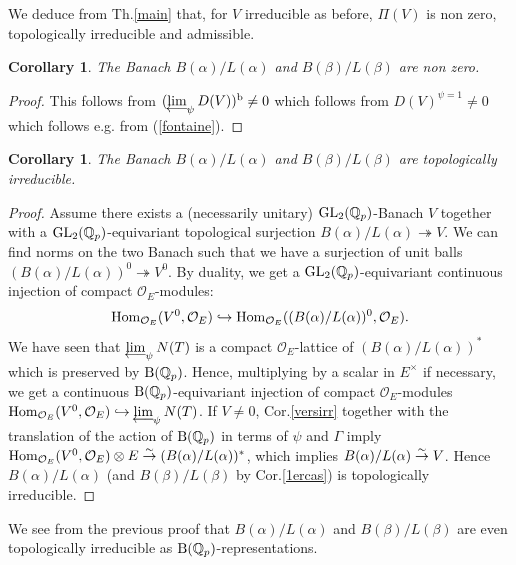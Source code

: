 \documentclass[11pt]{amsart}
\def\limproj{\mathop{\oalign{{\rm lim}\cr 
\hidewidth$\longleftarrow$\hidewidth\cr}}}
\def\Q{{\mathbb Q}_p}
\def\G{{\rm GL}_2(\Q)}
\def\B{{\rm B}(\Q)}
\def\O{{\mathcal O}_E}
\newtheorem{cor}[definit]{\bf{Corollary}}
\begin{document}
We deduce from Th.\ref{main} that, for $V$ irreducible as before,
$\Pi(V)$ is non zero, topologically irreducible and admissible.  
 
\begin{cor} 
The Banach $B(\alpha)/L(\alpha)$ and $B(\beta)/L(\beta)$ are non zero. 
\end{cor} 
\begin{proof} 
This follows from $(\limproj_{\psi}D(V))^{\rm b}\ne 0$ which follows
from $D(V)^{\psi=1}\ne 0$ which follows e.g. from (\ref{fontaine}).  
\end{proof} 
 
\begin{cor}\label{irreductible} 
The Banach $B(\alpha)/L(\alpha)$ and $B(\beta)/L(\beta)$ are topologically irreducible. 
\end{cor} 
\begin{proof} 
Assume there exists a (necessarily unitary) $\G$-Banach $V$ together
with a $\G$-equivariant topological surjection
$B(\alpha)/L(\alpha)\twoheadrightarrow V$. We can find norms on the
two Banach such that we have a surjection of unit balls
$(B(\alpha)/L(\alpha))^0\twoheadrightarrow V^0$. By duality, we get a
$\G$-equivariant continuous injection of compact $\O$-modules:  
$${\rm Hom}_{\O}(V^0,\O)\hookrightarrow {\rm
  Hom}_{\O}((B(\alpha)/L(\alpha))^0,\O).$$  
We have seen that $\limproj_{\psi}N(T)$ is a compact $\O$-lattice of
  $(B(\alpha)/L(\alpha))^*$ which is preserved by $\B$. Hence,
  multiplying by a scalar in $E^{\times}$ if necessary, we get a
  continuous $\B$-equivariant injection of compact $\O$-modules ${\rm
  Hom}_{\O}(V^0,\O)\hookrightarrow \limproj_{\psi}N(T)$. If $V\ne 0$,
  Cor.\ref{versirr} together with the translation of the action of
  $\B$ in terms of $\psi$ and $\Gamma$ imply ${\rm
  Hom}_{\O}(V^0,\O)\otimes E\buildrel\sim\over\rightarrow
  (B(\alpha)/L(\alpha))^*$, which implies
  $B(\alpha)/L(\alpha)\buildrel\sim\over\rightarrow V$. Hence
  $B(\alpha)/L(\alpha)$ (and $B(\beta)/L(\beta)$ by Cor.\ref{1ercas})
  is topologically irreducible.  
\end{proof} 
 
We see from the previous proof that $B(\alpha)/L(\alpha)$ and
$B(\beta)/L(\beta)$ are even topologically irreducible as
$\B$-representations.  
 
\end{document}
